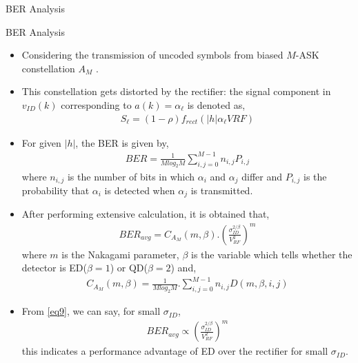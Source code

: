 \documentclass{beamer}
\begin{document}
\begin{section}{BER Analysis}
\begin{frame}{BER Analysis}
\begin{itemize}
    \item Considering the transmission of uncoded symbols from biased $M$-ASK constellation $A_{M}$ .
    \item This constellation gets distorted by the rectifier: the signal component in $v_{ID}(k)$ corresponding to $a(k) =\alpha_{\ell}$ is denoted as,
    \begin{align}
        S_{\ell}=(1 - \rho ) f_{rect}(|h|\alpha_{\ell}V{RF})
    \end{align}
    \item For given $|h|$, the BER is given by,
    \begin{align}
        BER=\frac{1}{Mlog_{2}M}\sum\limits_{i,j=0}^{M-1}n_{i,j}P_{i,j}
    \end{align}
    where $n_{i,j}$ is the number of bits in which $\alpha_{i}$ and $\alpha_{j}$ differ and $P_{i,j}$ is the probability that $\alpha_i$ is detected when $\alpha_j$ is transmitted. 
\end{itemize}
\end{frame}
\begin{frame}
    \begin{itemize}
    \item After performing extensive calculation, it is obtained that,
    \begin{align}
        BER_{avg}=C_{A_{M}}(m,\beta).\left(\frac{\sigma_{ID}^{2/\beta}}{V_{RF}^2}\right)^m
    \label{eq9}
    \end{align}
    where $m$ is the Nakagami parameter, $\beta$ is the variable which tells whether the detector is ED($\beta=1$) or QD($\beta=2$) and,
    \begin{align}
        C_{A_{M}}(m,\beta)=\frac{1}{Mlog_{2}M}.\sum\limits_{i,j=0}^{M-1}n_{i,j}D(m,\beta,i,j)
    \end{align}
    \item From \eqref{eq9}, we can say, for small $\sigma_{ID}$, 
    \begin{align}
        BER_{avg} \propto \left(\frac{\sigma_{ID}^{2/\beta}}{V_{RF}^2}\right)^m
    \end{align}
    this indicates a performance advantage of ED over the rectifier for small $\sigma_{ID}$.
    \end{itemize}
\end{frame}
\begin{frame}

\end{frame}
\end{section}
\end{document}
